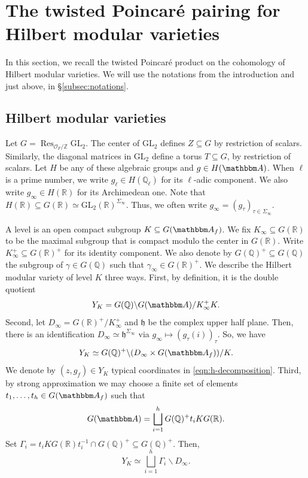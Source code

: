 \documentclass[10pt, twoside]{amsart}
\theoremstyle{plain}
\theoremstyle{definition}
\theoremstyle{remark}
\numberwithin{equation}{subsection}
\def\Q{\mathbb Q}
\def\Z{\mathbb Z}
\def\R{\mathbb R}
\def\A{\mathbbm A}
\def\GL{\mathrm{GL}}
\def\gh{\mathfrak h}
\def\scro{\mathscr O}
\def\scro{\mathscr O}
\begin{document}

\section{The twisted Poincar\'e pairing for Hilbert modular varieties}\label{sec1}
In this section, we recall the twisted Poincar\'e product on the cohomology of Hilbert modular varieties. We will use the notations from the introduction and just above, in \S \ref{subsec:notations}.

\subsection{Hilbert modular varieties} \label{sec2.1}
Let $G = \operatorname{Res}_{\scro_F/\Z} \GL_2$. The center of $\GL_2$ defines $Z \subseteq G$ by restriction of scalars. Similarly, the diagonal matrices in $\GL_2$ define a torus $T \subseteq G$, by restriction of scalars.
Let $H$ be any of these algebraic groups and $g \in H(\A)$. When $\ell$ is a prime number, we write $g_\ell \in H(\Q_\ell)$ for its $\ell$-adic component. We also write $g_\infty \in H(\R)$ for its Archimedean one. Note that $H(\R) \subseteq G(\R) \simeq \GL_2(\R)^{\Sigma_\infty}$. Thus, we often write $g_\infty = (g_\tau)_{\tau \in \Sigma_\infty}$.

A level is an open compact subgroup $K\subseteq G(\A_f)$. We fix $K_\infty \subseteq G(\R)$ to be the maximal subgroup that is compact modulo the center in $G(\R)$. Write $K_\infty^+ \subseteq G(\R)^+$ for its identity component. We also denote by $G(\Q)^+ \subseteq G(\Q)$ the subgroup of $\gamma \in G(\Q)$ such that $\gamma_\infty \in G(\R)^+$.  We describe the Hilbert modular variety of level $K$ three ways. First, by definition, it is the double quotient
$$
Y_K = G(\Q) \backslash G(\A) / K_\infty^+K.
$$
Second, let $D_\infty = G(\R)^+/K_\infty^+$ and $\gh$ be the complex upper half plane. Then, there is an identification $D_\infty \simeq \gh^{\Sigma_\infty}$ via $g_\infty \mapsto (g_\tau(i))_{\tau}$. So, we have
\begin{equation}\label{eqn:h-decomposition}
Y_K \simeq G(\Q)^+\backslash (D_\infty \times G(\A_f))/K.
\end{equation}
We denote by $(z,g_f) \in Y_K$ typical coordinates in \eqref{eqn:h-decomposition}. Third, by strong approximation we may choose a finite set of elements $t_1,\dotsc,t_h \in G(\A_f)$ such that
\begin{equation}\label{eqn:adelic-decomposition}
G(\A) = \bigsqcup_{i=1}^h G(\Q)^+ t_i K G(\R).
\end{equation}
Set $\Gamma_i = t_i K G(\R) t_i^{-1} \cap G(\Q)^+ \subseteq G(\Q)^+$. Then,
\begin{equation}\label{eqn:manifold-decomposition}
Y_K \simeq \bigsqcup_{i=1}^h \Gamma_i \backslash D_\infty.
\end{equation}
\end{document}
